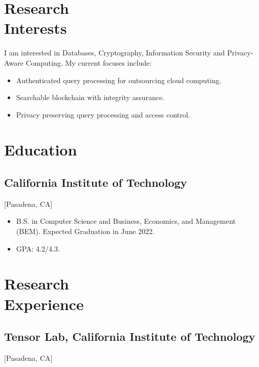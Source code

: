 \documentclass{mycv}
\begin{document}
\maketitle%

\section{Research \\ Interests}

I am interested in Databases, Cryptography, Information Security and Privacy-Aware Computing. My current focuses include:

\begin{itemize}
  \item Authenticated query processing for outsourcing cloud computing.
  \item Searchable blockchain with integrity assurance.
  \item Privacy preserving query processing and access control.
\end{itemize}

\section{Education}

\subsection{California Institute of Technology}[Pasadena, CA]
\vspace{-\parskip}%
\begin{itemize}
  \item B.S. in Computer Science and Business, Economics, and Management  \\
  (BEM). Expected Graduation in June 2022.
  \item GPA: 4.2/4.3.
\end{itemize}



\section{Research \\ Experience}

\subsection{Tensor Lab, California Institute of Technology}[Pasadena, CA]
\begin{positions}
\end{positions}
\end{document}
